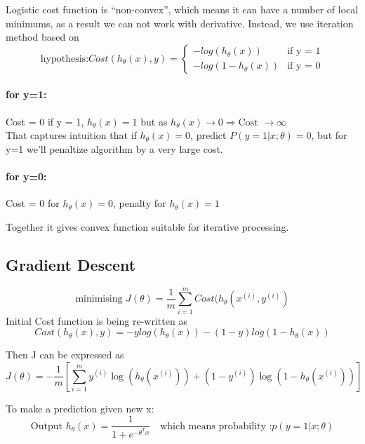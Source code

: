 \documentclass{scrartcl}
\begin{document}
Logistic cost function is ``non-convex'', which means it can have a
number of local minimums, as a result we can not work with derivative.
Instead, we use iteration method based on \[ \textrm{hypothesis:}
Cost(h_\theta(x), y) = \left\{ \begin{array}
    {rr} -log(h_\theta(x)) & \textrm{if y = 1} \\
    -log(1- h_\theta(x)) & \textrm{if y = 0}
  \end{array} \right. \]

\paragraph{for y=1:}
Cost = 0 if y = 1, $h_\theta(x) = 1$
but as $h_\theta(x) \to 0 \Rightarrow \textrm{Cost } \to \infty $ \\
That captures intuition that if $h_\theta(x) = 0$, predict
$P(y=1|x;\theta) = 0$, but for y=1 we'll penaltize algorithm by a very
large cost.

\paragraph{for y=0:}
Cost = 0 for $h_\theta(x) = 0$, penalty for $h_\theta(x) = 1$

Together it gives convex function suitable for iterative processing.

\subsection{Gradient Descent}
\label{sec:6-5}
\[\textrm{minimising } J(\theta) = \frac{1}{m} \sum\limits_{i=1}^m
Cost (h_\theta(x^{(i)}, y^{(i)}) \] Initial Cost function is being
re-written as \[ Cost(h_\theta(x), y) = -ylog(h_\theta(x)) -
(1-y)log(1-h_\theta(x))
\]

Then J can be expressed as \[ J(\theta) = -\frac{1}{m} \left[
  \sum\limits_{i=1}^m y^{(i)} \log (h_\theta(x^{(i)})) + (1-y^{(i)})
  \log (1 - h_\theta(x^{(i)})) \right] \]

To make a prediction given new x: \[ \textrm{Output } h_\theta(x) =
\frac{1}{1 + e^{-\theta^Tx}} \quad \textrm{which means probability :}
p(y=1|x; \theta)
\]
\end{document}
